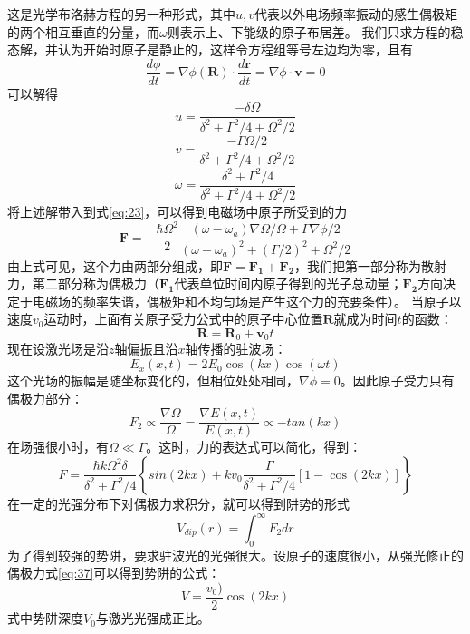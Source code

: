 \documentclass{article}
\begin{document}
	这是光学布洛赫方程的另一种形式，其中$u,v$代表以外电场频率振动的感生偶极矩的两个相互垂直的分量，而$\omega$则表示上、下能级的原子布居差。
	我们只求方程的稳态解，并认为开始时原子是静止的，这样令方程组等号左边均为零，且有
	\begin{equation}
		\frac{d\phi}{dt} = \nabla \phi(\boldsymbol{R}) \cdot \frac{d\boldsymbol{r}}{dt} = \nabla \phi \cdot \boldsymbol{v} = 0
	\end{equation}
	可以解得
	\begin{equation}
		u = \frac{-\delta \Omega}{\delta^2 + \Gamma^2/4 + \Omega^2/2}
	\end{equation}
	\begin{equation}
		v = \frac{-\Gamma \Omega/2}{\delta^2 + \Gamma^2/4 + \Omega^2/2}
	\end{equation}
	\begin{equation}
		\omega = \frac{\delta^2 + \Gamma^2/4}{\delta^2 + \Gamma^2/4 + \Omega^2/2}
	\end{equation}
	将上述解带入到式\ref{eq:23}，可以得到电磁场中原子所受到的力
	\begin{equation}
		\boldsymbol{F} = - \frac{\hbar \Omega^2}{2} \frac{(\omega - \omega_a) \nabla \Omega/\Omega + \Gamma \nabla \phi/2}{(\omega - \omega_a)^2 + (\Gamma/2)^2 + \Omega^2/2}
	\end{equation}
	由上式可见，这个力由两部分组成，即$\boldsymbol{F} = \boldsymbol{F_1} + \boldsymbol{F_2}$，我们把第一部分称为散射力，第二部分称为偶极力（$\boldsymbol{F_1}$代表单位时间内原子得到的光子总动量；$\boldsymbol{F_2}$方向决定于电磁场的频率失谐，偶极矩和不均匀场是产生这个力的充要条件）。
	当原子以速度$v_0$运动时，上面有关原子受力公式中的原子中心位置$\boldsymbol{R}$就成为时间$t$的函数：
	\begin{equation}
		\boldsymbol{R} = \boldsymbol{R}_0 + \boldsymbol{v}_0t
	\end{equation}
	现在设激光场是沿$z$轴偏振且沿$x$轴传播的驻波场：
	\begin{equation}
		E_x(x,t) = 2E_0\cos(kx)\cos(\omega t)
	\end{equation}
	这个光场的振幅是随坐标变化的，但相位处处相同，$\nabla \phi = 0$。因此原子受力只有偶极力部分：
	\begin{equation}
		F_2 \propto \frac{\nabla \Omega}{\Omega} = \frac{\nabla E(x,t)}{E(x,t)} \propto -tan(kx)
	\end{equation}
	在场强很小时，有$\Omega \ll \Gamma$。这时，力的表达式可以简化，得到：
	\begin{equation}
		F = \frac{\hbar k \Omega^2 \delta}{\delta^2 + \Gamma^2/4} \left\{ sin(2kx) + kv_0 \frac{\Gamma}{\delta^2 + \Gamma^2/4}[1-\cos(2kx)] \right\} \label{eq:37}
	\end{equation}
	在一定的光强分布下对偶极力求积分，就可以得到阱势的形式
	\begin{equation}
		V_{dip}(r) = \int_0^{\infty} F_2 dr
	\end{equation}
	为了得到较强的势阱，要求驻波光的光强很大。设原子的速度很小，从强光修正的偶极力式\ref{eq:37}可以得到势阱的公式：
	\begin{equation}
		V = \frac{v_0)}{2} \cos(2kx)
	\end{equation}
	式中势阱深度$V_0$与激光光强成正比。
\end{document}
